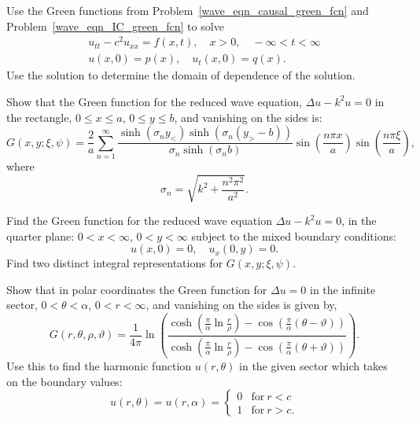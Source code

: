 {%
\begin{Exercise}
  Use the Green functions from Problem~\ref{wave_eqn_causal_green_fcn}
  and Problem~\ref{wave_eqn_IC_green_fcn} to solve
  \begin{gather*}
    u_{t t} - c^2 u_{x x} = f(x,t), \quad x > 0, \quad -\infty < t < \infty \\
    u(x,0) = p(x), \quad u_t(x,0) = q(x).
  \end{gather*}
  Use the solution to determine the domain of dependence of the solution.
\end{Exercise}



\begin{Exercise}
  Show that the Green function for the reduced wave equation, 
  $\Delta u - k^2 u = 0$ in the rectangle, $0 \leq x \leq a$, 
  $0 \leq y \leq b$, and vanishing on the sides is:
  \[
  G(x,y;\xi,\psi) = \frac{2}{a} \sum_{n = 1}^\infty 
  \frac{ \sinh(\sigma_n y_<) \sinh(\sigma_n(y_>-b)) }
  { \sigma_n \sinh(\sigma_n b) }
  \sin \left( \frac{n \pi x}{a} \right)
  \sin \left( \frac{n \pi \xi}{a} \right),
  \]
  where 
  \[
  \sigma_n = \sqrt{ k^2 + \frac{n^2 \pi^2}{a^2} }.
  \]
\end{Exercise}



\begin{Exercise}
  Find the Green function for the reduced wave equation $\Delta u - k^2 u = 0$,
  in the quarter plane: $0 < x < \infty$, $0 < y < \infty$ subject to
  the mixed boundary conditions:
  \[
  u(x,0) = 0, \quad u_x(0,y) = 0.
  \]
  Find two distinct integral representations for $G(x,y;\xi,\psi)$.
\end{Exercise}





\begin{Exercise}
  Show that in polar coordinates the Green function for $\Delta u = 0$ in
  the infinite sector, $0 < \theta < \alpha$, $0 < r < \infty$, and
  vanishing on the sides is given by,
  \[
  G(r, \theta, \rho, \vartheta ) = \frac{1}{4\pi} \ln \left(
    \frac{ \cosh \left( \frac{\pi}{\alpha} \ln \frac{r}{\rho} \right)
      - \cos \left( \frac{\pi}{\alpha} (\theta - \vartheta) \right) }
    { \cosh \left( \frac{\pi}{\alpha} \ln \frac{r}{\rho} \right)
      - \cos \left( \frac{\pi}{\alpha} (\theta + \vartheta) \right) }\right).
  \]
  Use this to find the harmonic function $u(r, \theta)$ in the given sector
  which takes on the boundary values:
  \[
  u(r,\theta) = u(r,\alpha) =
  \begin{cases}
    0 &\mathrm{for}\ r < c \\
    1 &\mathrm{for}\ r > c.
  \end{cases}
  \]
\end{Exercise}







}
